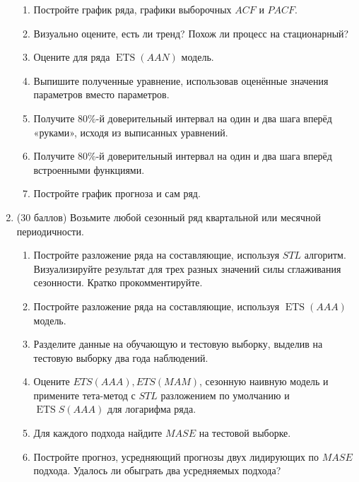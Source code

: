 \documentclass[a4paper,12pt]{article}
\begin{document}
\begin{enumerate}
	\begin{enumerate}
		\item Постройте график ряда, графики выборочных $A C F$ и $P A C F$.
		\item Визуально оцените, есть ли тренд? Похож ли процесс на стационарный?
		\item Оцените для ряда $\operatorname{ETS}(A A N)$ модель.
		\item Выпишите полученные уравнение, использовав оценённые значения параметров вместо параметров.
		\item Получите $80 \%$-й доверительный интервал на один и два шага вперёд «руками», исходя из выписанных уравнений.
		\item Получите 80\%-й доверительный интервал на один и два шага вперёд встроенными функциями.
		\item Постройте график прогноза и сам ряд.
	\end{enumerate}
	\newpage
	\item (30 баллов) Возьмите любой сезонный ряд квартальной или месячной периодичности.
	
	\begin{enumerate}
	\item Постройте разложение ряда на составляющие, используя $S T L$ алгоритм. Визуализируйте результат для трех разных значений силы сглаживания сезонности. Кратко прокомментируйте.
	\item Постройте разложение ряда на составляющие, используя $\operatorname{ETS}(A A A)$ модель.
	\item Разделите данные на обучающую и тестовую выборку, выделив на тестовую выборку два года наблюдений.
	\item Оцените $E T S(A A A), E T S(M A M)$, сезонную наивную модель и примените тета-метод с $S T L$ разложением по умолчанию и $\operatorname{ETS} S(A A A)$ для логарифма ряда.
	\item Для каждого подхода найдите $M A S E$ на тестовой выборке.
	\item Постройте прогноз, усредняющий прогнозы двух лидирующих по $M A S E$ подхода. Удалось ли обыграть два усредняемых подхода?
	
	\end{enumerate}
	

	
	\end{enumerate}

	
\end{document}
